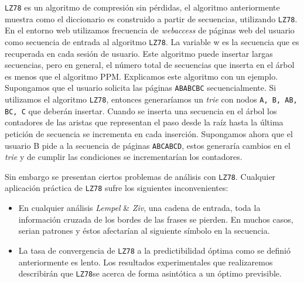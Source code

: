 


\texttt{LZ78} es un algoritmo de compresión sin pérdidas, el algoritmo anteriormente muestra  como el diccionario es construido  a partir de secuencias, utilizando \texttt{LZ78}. En el entorno web utilizamos frecuencia de \emph{webaccess} de páginas web del usuario como secuencia de entrada al algoritmo \texttt{LZ78}. La variable w es la secuencia que es recuperada en cada sesión de usuario. Este algoritmo puede insertar largas secuencias, pero en general, el número total de secuencias que inserta en el árbol es menos que el algoritmo PPM. Explicamos este algoritmo con un ejemplo. Supongamos que el usuario solicita las páginas \texttt{ABABCBC} secuencialmente. Si utilizamos el algoritmo \texttt{LZ78}, entonces generaríamos un \emph{trie} con nodos  \texttt{A, B, AB, BC, C} que deberán insertar. 
Cuando se inserta una secuencia en el árbol los contadores de las aristas que representan el paso desde la raíz hasta la última petición de secuencia se incrementa en cada inserción. Supongamos ahora que el usuario B pide a la secuencia de páginas \texttt{ABCABCD}, estos generaría cambios en el \emph{trie} y de cumplir las condiciones se incrementarían los contadores. 






Sin embargo se presentan ciertos problemas de análisis con \texttt{LZ78}. Cualquier aplicación práctica de \texttt{LZ78} sufre  los siguientes inconvenientes: 

\begin{itemize}
	\item En cualquier análisis \emph{Lempel} \& \emph{Ziv}, una cadena de entrada, toda la información cruzada de los bordes de las frases se pierden. En muchos casos, serian patrones y éstos afectarían al siguiente símbolo en la secuencia.
	
	\item La tasa de convergencia de \texttt{LZ78} a la predictibilidad óptima como se definió anteriormente es lento. Los resultados experimentales que realizaremos  describirán que \texttt{LZ78}se acerca de forma asintótica a un óptimo previsible.
	
	
	
\end{itemize}


